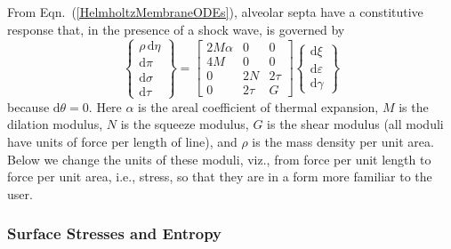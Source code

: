 From Eqn.~(\ref{HelmholtzMembraneODEs}), alveolar septa have a constitutive response that, in the presence of a shock wave, is governed by
\begin{equation*}
\left\{ \begin{matrix}
\rho \, \mathrm{d} \eta \\
\mathrm{d} \pi \\ \mathrm{d} \sigma \\ \mathrm{d} \tau
\end{matrix} \right\} = \begin{bmatrix}
2 M \alpha & 0 & 0 \\
4 M & 0 & 0 \\
0 & 2 N & 2\tau \\
0 & 2\tau & G
\end{bmatrix} \left\{ \begin{matrix}
\mathrm{d} \xi \\ \mathrm{d} \varepsilon \\ \mathrm{d} \gamma
\end{matrix} \right\}
\end{equation*}
because $\mathrm{d} \theta = 0$.  Here $\alpha$ is the areal coefficient of thermal expansion, $M$ is the dilation modulus, $N$ is the squeeze modulus, $G$ is the shear modulus (all moduli have units of force per length of line), and $\rho$ is the mass density per unit area.  Below we change the units of these moduli, viz., from force per unit length to force per unit area, i.e., stress, so that they are in a form more familiar to the user.

\subsubsection{Surface Stresses and Entropy}

